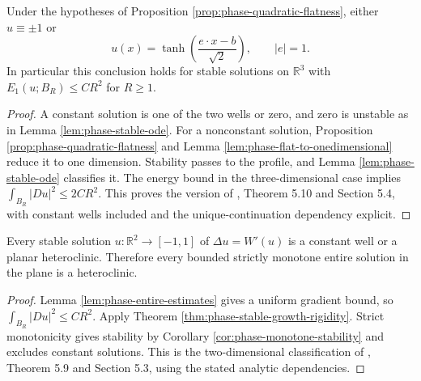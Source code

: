 \begin{theorem}\label{thm:phase-stable-growth-rigidity}
Under the hypotheses of Proposition \ref{prop:phase-quadratic-flatness}, either $u\equiv\pm1$ or
\[
 u(x)=\tanh\left(\frac{e\cdot x-b}{\sqrt2}\right),
 \qquad |e|=1.
\]
In particular this conclusion holds for stable solutions on $\mathbb R^3$ with $E_1(u;B_R)\leq CR^2$ for $R\geq1$.
\end{theorem}
\begin{proof}
A constant solution is one of the two wells or zero, and zero is unstable as in Lemma \ref{lem:phase-stable-ode}. For a nonconstant solution, Proposition \ref{prop:phase-quadratic-flatness} and Lemma \ref{lem:phase-flat-to-onedimensional} reduce it to one dimension. Stability passes to the profile, and Lemma \ref{lem:phase-stable-ode} classifies it. The energy bound in the three-dimensional case implies $\int_{B_R}|Du|^2\leq2CR^2$. This proves the version of \cite{ChAC}, Theorem 5.10 and Section 5.4, with constant wells included and the unique-continuation dependency explicit.
\end{proof}

\begin{corollary}\label{cor:phase-planar-stable}
Every stable solution $u:\mathbb R^2\to[-1,1]$ of $\Delta u=W'(u)$ is a constant well or a planar heteroclinic. Therefore every bounded strictly monotone entire solution in the plane is a heteroclinic.
\end{corollary}
\begin{proof}
Lemma \ref{lem:phase-entire-estimates} gives a uniform gradient bound, so $\int_{B_R}|Du|^2\leq CR^2$. Apply Theorem \ref{thm:phase-stable-growth-rigidity}. Strict monotonicity gives stability by Corollary \ref{cor:phase-monotone-stability} and excludes constant solutions. This is the two-dimensional classification of \cite{ChAC}, Theorem 5.9 and Section 5.3, using the stated analytic dependencies.
\end{proof}
